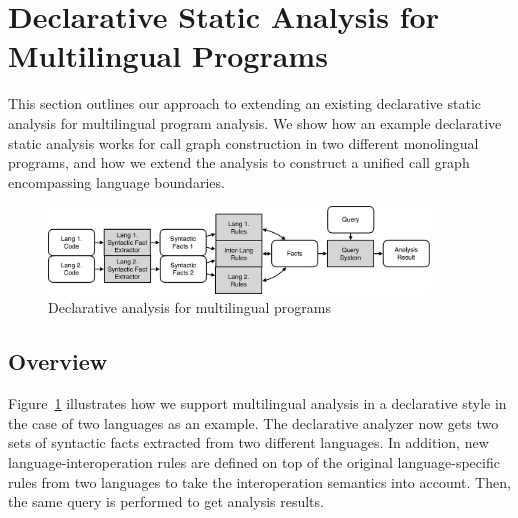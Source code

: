 
\section{Declarative Static Analysis for Multilingual Programs}
This section outlines our approach to extending an existing
declarative static analysis for multilingual program analysis.
We show how an example declarative static analysis works
for call graph construction in two different monolingual programs, and
how we extend the analysis to construct a unified call graph
encompassing language boundaries.

\begin{figure}[t]
  \centering
  \vspace{2mm}
  \includegraphics[width=0.9\textwidth]{img/ov2.pdf}
  \caption{Declarative analysis for multilingual programs}
  \label{fig:ov2}
\end{figure}

\subsection{Overview}
Figure~\ref{fig:ov2} illustrates how we support multilingual analysis in a
declarative style in the case of two languages as an example. The declarative
analyzer now gets two sets of syntactic facts extracted from two different
languages. In addition, new language-interoperation rules are defined on top of
the original language-specific rules from two languages to take the
interoperation semantics into account. Then, the same query is performed to get
analysis results.

%

